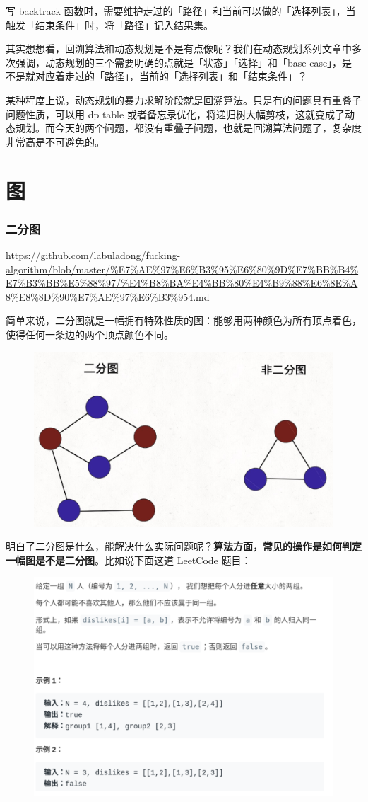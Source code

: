 \documentclass[12pt]{article}
\begin{document}
写 backtrack 函数时，需要维护走过的「路径」和当前可以做的「选择列表」，当触发「结束条件」时，将「路径」记入结果集。

其实想想看，回溯算法和动态规划是不是有点像呢？我们在动态规划系列文章中多次强调，动态规划的三个需要明确的点就是「状态」「选择」和「base case」，是不是就对应着走过的「路径」，当前的「选择列表」和「结束条件」？

某种程度上说，动态规划的暴力求解阶段就是回溯算法。只是有的问题具有重叠子问题性质，可以用 dp table 或者备忘录优化，将递归树大幅剪枝，这就变成了动态规划。而今天的两个问题，都没有重叠子问题，也就是回溯算法问题了，复杂度非常高是不可避免的。



\part{图}
\section{二分图}
\url{https://github.com/labuladong/fucking-algorithm/blob/master/%E7%AE%97%E6%B3%95%E6%80%9D%E7%BB%B4%E7%B3%BB%E5%88%97/%E4%B8%BA%E4%BB%80%E4%B9%88%E6%8E%A8%E8%8D%90%E7%AE%97%E6%B3%954.md}

简单来说，二分图就是一幅拥有特殊性质的图：能够用两种颜色为所有顶点着色，使得任何一条边的两个顶点颜色不同。
\begin{figure}[H]
    \centering
    \includegraphics[width=.5\textwidth]{fig/FA_BiGraph_1.png}
\end{figure}

明白了二分图是什么，能解决什么实际问题呢？\textbf{算法方面，常见的操作是如何判定一幅图是不是二分图}。比如说下面这道 LeetCode 题目：
\begin{figure}[H]
    \centering
    \includegraphics[width=.8\textwidth]{fig/FA_BiGraph_2.png}
\end{figure}
\end{document}
